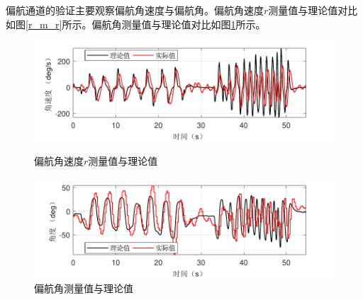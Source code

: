 偏航通道的验证主要观察偏航角速度与偏航角。偏航角速度$ r $测量值与理论值对比如图\ref{r_m_r}所示。偏航角测量值与理论值对比如图\ref{yaw_m_r}所示。
\begin{figure}[htbp]
	\centering	
	\includegraphics[scale=1]{Fig/r_m_r.pdf}
	\caption{\label{r_m_r}偏航角速度$ r $测量值与理论值}
	\centering	
	\includegraphics[scale=1]{Fig/yaw_m_r.pdf}
	\caption{\label{yaw_m_r}偏航角测量值与理论值}
\end{figure}
